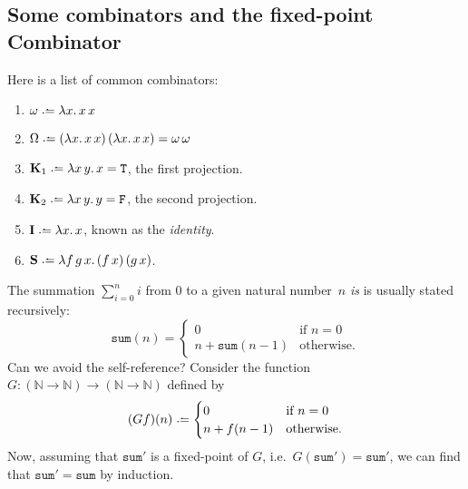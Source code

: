 \subsection{Some combinators and the fixed-point Combinator}
Here is a list of common combinators:
\begin{enumerate}
  \item $\omega \defeq \lambda x.\, x\,x$
  \item $\Omega \defeq (\lambda x.\, x\,x)\,(\lambda x.\,x\,x)
    = \omega\,\omega$
  \item $\mathbf{K}_1 \defeq \lambda x\,y.\, x = \mathtt{T}$, the first projection.
  \item $\mathbf{K}_2 \defeq \lambda x\,y.\, y = \mathtt{F}$, the second projection.
  \item $\mathbf{I} \defeq \lambda x.\, x$, known as the \emph{identity}.
  \item $\mathbf{S}\defeq\lambda f\,g\,x.\, 
    (f\,x)\,(g\,x)$.
\end{enumerate}
\begin{example}
  The summation $\sum_{i = 0}^{n} i$ from $0$ to a given natural number~$n$
  \emph{is} is usually stated recursively:
  \[
    \mathtt{sum}(n) =
      \begin{cases} 
       0 & \text{if } n = 0 \\
       n + \mathtt{sum}(n - 1)  & \text{otherwise}.
      \end{cases}
  \]
  Can we avoid the self-reference? Consider the function
  $G\colon (\mathbb{N} \to \mathbb{N}) \to (\mathbb{N} \to \mathbb{N})$
  defined by
  \begin{equation} \label{eq:summation}
    (Gf)(n) \defeq
    \begin{cases}
       0 & \text{if } n = 0 \\
       n + f(n - 1)  & \text{otherwise}.
    \end{cases}
  \end{equation}
  Now, assuming that $\mathtt{sum}'$ is a fixed-point of $G$, i.e.\
  $G(\mathtt{sum}') =\mathtt{sum}'$, we can find that $\mathtt{sum}' =
  \mathtt{sum}$ by induction. 
\end{example}

